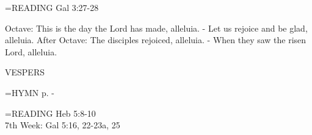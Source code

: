 \hangindent=\parindent \small{\uppercase{READING}}    Gal 3:27-28 \textbf{   \\}

Octave:	This is the day the Lord has made, alleluia.
- Let us rejoice and be glad, alleluia.
After Octave:	The disciples rejoiced, alleluia.
- When they saw the risen Lord, alleluia.

\begin{flushleft}\normalsize VESPERS\\\end{flushleft}

\hangindent=\parindent \small{\uppercase{HYMN} p. \pageref{easter:firstHymn}-\pageref{easter:lastHymn}\\}

\hangindent=\parindent \small{\uppercase{READING}}    Heb 5:8-10 \textbf{   \\}
7th Week:	Gal 5:16, 22-23a, 25    
